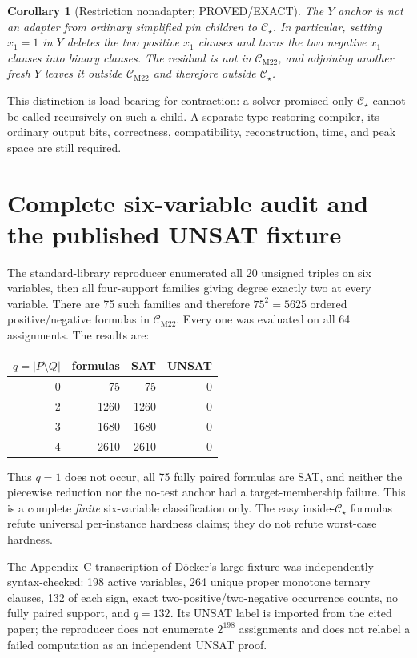 \documentclass[11pt]{article}
\newtheorem{corollary}[theorem]{Corollary}
\newcommand{\Cstar}{\mathcal C_\star}
\newcommand{\CM}{\mathcal C_{\mathrm{M22}}}
\begin{document}
\begin{corollary}[Restriction nonadapter; PROVED/EXACT]
The $Y$ anchor is not an adapter from ordinary simplified pin children to
$\Cstar$.  In particular, setting $x_1=1$ in $Y$ deletes the two positive
$x_1$ clauses and turns the two negative $x_1$ clauses into binary clauses.
The residual is not in $\CM$, and adjoining another fresh $Y$ leaves it outside
$\CM$ and therefore outside $\Cstar$.
\end{corollary}
This distinction is load-bearing for contraction: a solver promised only
$\Cstar$ cannot be called recursively on such a child.  A separate type-restoring
compiler, its ordinary output bits, correctness, compatibility, reconstruction,
time, and peak space are still required.

\section{Complete six-variable audit and the published UNSAT fixture}
The standard-library reproducer enumerated all 20 unsigned triples on six
variables, then all four-support families giving degree exactly two at every
variable.  There are 75 such families and therefore $75^2=5625$ ordered
positive/negative formulas in $\CM$.  Every one was evaluated on all 64
assignments.  The results are:
\begin{center}
\begin{tabular}{@{}rrrr@{}}\toprule
$q=|P\setminus Q|$ & formulas & SAT & UNSAT\\\midrule
0&75&75&0\\
2&1260&1260&0\\
3&1680&1680&0\\
4&2610&2610&0\\\bottomrule
\end{tabular}
\end{center}
Thus $q=1$ does not occur, all 75 fully paired formulas are SAT, and neither
the piecewise reduction nor the no-test anchor had a target-membership failure.
This is a complete \emph{finite} six-variable classification only.  The easy
inside-$\Cstar$ formulas refute universal per-instance hardness claims; they do
not refute worst-case hardness.

The Appendix~C transcription of Döcker's large fixture was independently
syntax-checked: 198 active variables, 264 unique proper monotone ternary clauses,
132 of each sign, exact two-positive/two-negative occurrence counts, no fully
paired support, and $q=132$.  Its UNSAT label is imported from the cited paper;
the reproducer does not enumerate $2^{198}$ assignments and does not relabel a
failed computation as an independent UNSAT proof.
\end{document}
